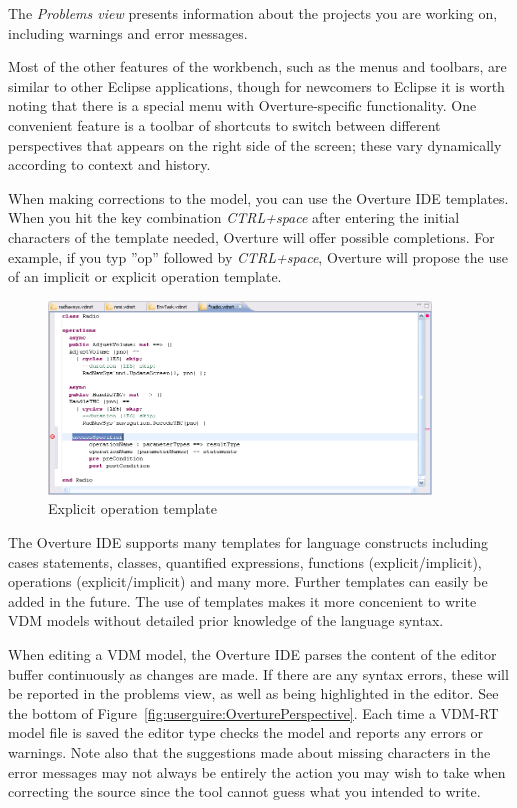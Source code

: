The \emph{Problems view} presents information about the projects you
are working on, including warnings and error messages. 

Most of the other features of the workbench, such as the menus and
toolbars, are similar to other Eclipse applications, though for
newcomers to Eclipse it is worth noting that there is a special menu
with Overture-specific functionality. One convenient feature is a
toolbar of shortcuts to switch between different perspectives that
appears on the right side of the screen; these vary dynamically
according to context and history.

When making corrections to the model, you can use the Overture IDE
templates. When you hit the key combination \textit{CTRL+space} after
entering the initial characters of the template needed, Overture will
offer possible completions. For example, if you typ ''op'' followed by
\textit{CTRL+space}, Overture will propose the use of an implicit or
explicit operation template.

\begin{figure}
	\begin{center}
	\includegraphics[width=4in]{figures/OperationTemplateRT}
	\caption{Explicit operation template}
	\label{fig:userguide:operationTemplate}
	\end{center}
\end{figure}

The Overture IDE supports many templates for language constructs
including cases statements, classes, quantified expressions, functions
(explicit/implicit), operations (explicit/implicit) and many
more. Further templates can easily be added in the future. The use of
templates makes it more concenient to write VDM models without
detailed prior knowledge of the language syntax.

When editing a VDM model, the Overture IDE parses the content of the
editor buffer continuously as changes are made. If there are any
syntax errors, these will be reported in the problems view, as well as
being highlighted in the editor. See the bottom of
Figure~\ref{fig:userguire:OverturePerspective}. Each time a
VDM-RT model file is saved the editor type checks the model and reports
any errors or warnings. Note also that the suggestions made about
missing characters in the
error messages may not always be entirely the action you may wish to
take when correcting the source since the tool cannot guess what you
intended to write.

